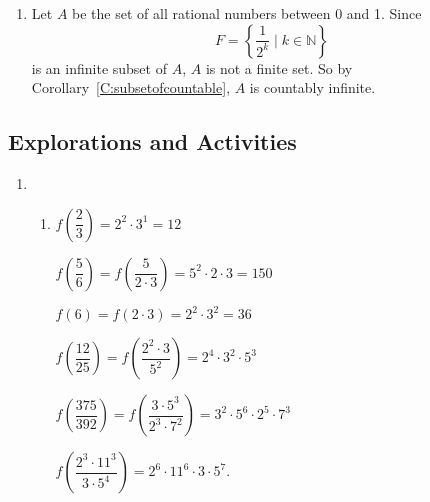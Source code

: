 \begin{enumerate}
\item Let $A$ be the set of all rational numbers between 0 and 1.  Since
\[
F = \left\{ \frac{1}{2^k} \mid k \in \mathbb{N} \right\}
\]
is an infinite subset of $A$, $A$ is not a finite set.  So by Corollary~\ref{C:subsetofcountable}, $A$ is countably infinite.
\end{enumerate}



\subsection*{Explorations and Activities}
\setcounter{oldenumi}{\theenumi}
\begin{enumerate} \setcounter{enumi}{\theoldenumi}
\item \begin{enumerate}
\item 
$f \left( \dfrac{2}{3} \right) = {2^2} \cdot {3^1} = 12$ 

$f \left( \dfrac{5}{6} \right) = f \left( \dfrac{5}{2 \cdot 3} \right) = {5^2}\cdot {2 \cdot 3} = 150$ 

$f \left( 6 \right) = f(2 \cdot 3) = 2^2 \cdot 3^2 = 36$ 

$f \left( \dfrac{12}{25} \right) = f \left( \dfrac{2^2 \cdot 3}{5^2} \right) = {2^4 \cdot 3^2}\cdot {5^3}$ 

$f \left( \dfrac{375}{392} \right) = f \left( \dfrac{3 \cdot 5^3}{2^3 \cdot 7^2} \right) = {3^2 \cdot 5^6} \cdot {2^5 \cdot 7^3}$

$f \left( \dfrac{2^3 \cdot 11^3}{3 \cdot 5^4} \right) = 2^6 \cdot 11^6 \cdot 3 \cdot 5^7$.



\end{enumerate}
\end{enumerate}
